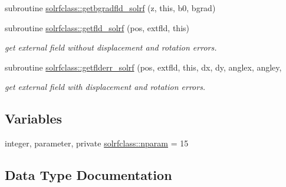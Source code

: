 \begin{DoxyCompactItemize}
subroutine \mbox{\hyperlink{namespacesolrfclass_adf7673f885573c8468f07faebc432d7d}{solrfclass\+::getbgradfld\+\_\+solrf}} (z, this, b0, bgrad)
\item 
subroutine \mbox{\hyperlink{namespacesolrfclass_a394f9bb9d3b50c8652a704f3c5af16ef}{solrfclass\+::getfld\+\_\+solrf}} (pos, extfld, this)
\begin{DoxyCompactList}\small\item\em get external field without displacement and rotation errors. \end{DoxyCompactList}\item 
subroutine \mbox{\hyperlink{namespacesolrfclass_a8a44826fce541cba8b4f7f5573ec7c98}{solrfclass\+::getflderr\+\_\+solrf}} (pos, extfld, this, dx, dy, anglex, angley,
\begin{DoxyCompactList}\small\item\em get external field with displacement and rotation errors. \end{DoxyCompactList}\end{DoxyCompactItemize}
\subsection*{Variables}
\begin{DoxyCompactItemize}
\item 
integer, parameter, private \mbox{\hyperlink{namespacesolrfclass_a01b965e25069cff9fb1797fbbcb9939d}{solrfclass\+::nparam}} = 15
\end{DoxyCompactItemize}


\subsection{Data Type Documentation}
\label{structsolrfclass_1_1solrf}
